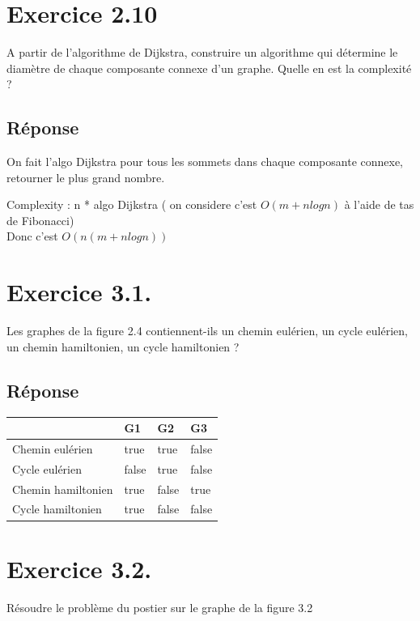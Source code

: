 \documentclass[12pt]{fphw}
\begin{document}
\section*{Exercice 2.10}
\begin{problem}
A partir de l’algorithme de Dijkstra, construire un algorithme qui
détermine le diamètre de chaque composante connexe d’un graphe. Quelle en est la
complexité ?
\end{problem}
\subsection*{Réponse}

On fait l'algo Dijkstra pour tous les sommets  dans chaque composante connexe, retourner le plus grand nombre.

Complexity : n * algo Dijkstra ( on considere c'est $O(m + n log n)$  à l’aide de tas de Fibonacci) \\

Donc c'est $ O(n(m+n log n))$

\section*{Exercice 3.1.}
\begin{problem}
Les graphes de la figure 2.4 contiennent-ils un chemin eulérien, un cycle
eulérien, un chemin hamiltonien, un cycle hamiltonien ?
\end{problem}
\subsection*{Réponse}
\begin{center}
	\begin{tabular}{l l l l}
		\toprule
		\textit{} & G1 & G2 & G3 \\
		\midrule
		Chemin eulérien & true & true & false\\
		Cycle eulérien & false & true & false\\
		Chemin hamiltonien & true & false & true\\
		Cycle hamiltonien & true & false & false\\
		\bottomrule
	\end{tabular}
\end{center}

\section*{Exercice 3.2.}
\begin{problem}
Résoudre le problème du postier sur le graphe de la figure 3.2
\end{problem}
\end{document}
